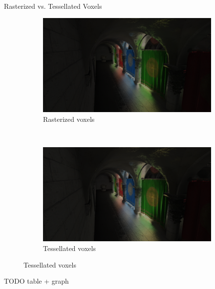 \documentclass[10pt]{beamer}
\begin{document}
\begin{frame}[allowframebreaks]{Rasterized vs. Tessellated Voxels}
  \begin{figure}
    \centering
    \begin{subfigure}[t]{0.5\textwidth}
        \includegraphics[width=\textwidth]{results_voxelraster.png}
        \caption{Rasterized voxels}
    \end{subfigure}
    ~
    \begin{subfigure}[t]{0.5\textwidth}
        \includegraphics[width=\textwidth]{results_voxeltess.png}
        \caption{Tessellated voxels}
    \end{subfigure}
  \end{figure}

  \framebreak
  TODO table + graph

\end{frame}
\end{document}
